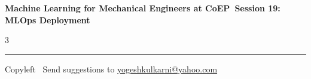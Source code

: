 \documentclass[8pt,landscape]{article}
\begin{document}
\footnotesize

\begin{center}
\Large{\textbf{Machine Learning for Mechanical Engineers at CoEP\ Session 19: MLOps Deployment}}
\end{center}

\begin{multicols}{3}

\end{multicols}

\rule{\linewidth}{0.25pt}
\scriptsize
Copyleft \textcopyleft\  Send suggestions to
\href{http://www.yogeshkulkarni.com}{yogeshkulkarni@yahoo.com}
\end{document}
